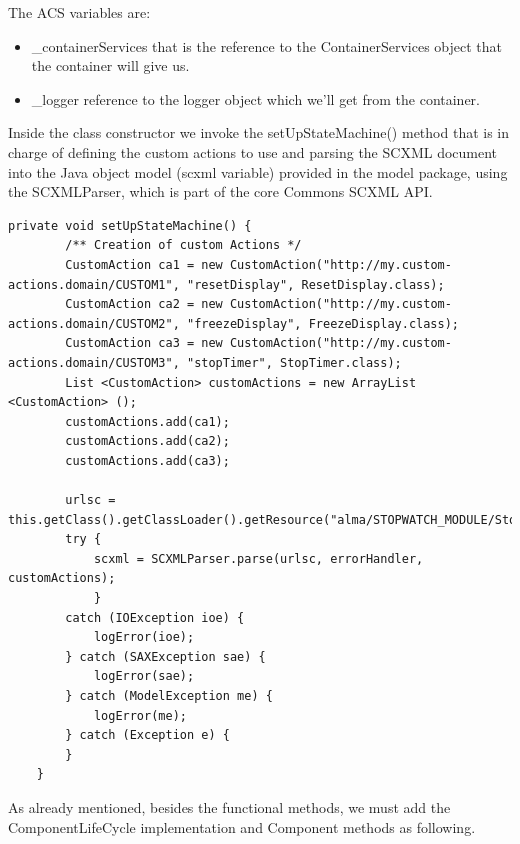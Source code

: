 \documentclass[]{article}
\begin{document}
The ACS variables are: 
\begin{itemize}
    \item \textsf{\_containerServices} that is the reference to the ContainerServices object that the container will give us.
    \item \textsf{\_logger} reference to the logger object which we'll get from the container. 
\end{itemize}

Inside the class constructor we invoke the \textsf{setUpStateMachine()} method that is in charge of defining the custom actions to use and parsing the SCXML document into the Java object model (\textsf{scxml} variable) provided in the model package, using the SCXMLParser, which is part of the core Commons SCXML API. 

\begin{lstlisting}
private void setUpStateMachine() {
        /** Creation of custom Actions */
        CustomAction ca1 = new CustomAction("http://my.custom-actions.domain/CUSTOM1", "resetDisplay", ResetDisplay.class);
        CustomAction ca2 = new CustomAction("http://my.custom-actions.domain/CUSTOM2", "freezeDisplay", FreezeDisplay.class);
        CustomAction ca3 = new CustomAction("http://my.custom-actions.domain/CUSTOM3", "stopTimer", StopTimer.class);
        List <CustomAction> customActions = new ArrayList <CustomAction> ();
        customActions.add(ca1);
        customActions.add(ca2);
        customActions.add(ca3);

        urlsc = this.getClass().getClassLoader().getResource("alma/STOPWATCH_MODULE/StopWatchImpl/config/stopwatch.xml");
        try {
            scxml = SCXMLParser.parse(urlsc, errorHandler, customActions);
            }
        catch (IOException ioe) {
            logError(ioe);
        } catch (SAXException sae) {
            logError(sae);
        } catch (ModelException me) {
            logError(me);
        } catch (Exception e) {
        }
    }
\end{lstlisting}

As already mentioned, besides the functional methods, we must add the \textsf{ComponentLifeCycle} implementation and Component methods as following. 
\end{document}
